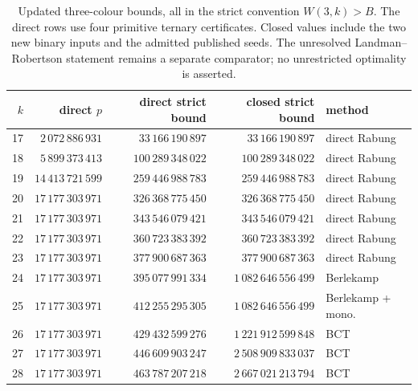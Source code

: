 \begin{table}[htbp]\centering\small\setlength{\tabcolsep}{4pt}
\begin{tabular}{rrrrl}\toprule $k$ & direct $p$ & direct strict bound & closed strict bound & method\\\midrule
17 & $2\,072\,886\,931$ & $33\,166\,190\,897$ & $33\,166\,190\,897$ & direct Rabung\\
18 & $5\,899\,373\,413$ & $100\,289\,348\,022$ & $100\,289\,348\,022$ & direct Rabung\\
19 & $14\,413\,721\,599$ & $259\,446\,988\,783$ & $259\,446\,988\,783$ & direct Rabung\\
20 & $17\,177\,303\,971$ & $326\,368\,775\,450$ & $326\,368\,775\,450$ & direct Rabung\\
21 & $17\,177\,303\,971$ & $343\,546\,079\,421$ & $343\,546\,079\,421$ & direct Rabung\\
22 & $17\,177\,303\,971$ & $360\,723\,383\,392$ & $360\,723\,383\,392$ & direct Rabung\\
23 & $17\,177\,303\,971$ & $377\,900\,687\,363$ & $377\,900\,687\,363$ & direct Rabung\\
24 & $17\,177\,303\,971$ & $395\,077\,991\,334$ & $1\,082\,646\,556\,499$ & Berlekamp\\
25 & $17\,177\,303\,971$ & $412\,255\,295\,305$ & $1\,082\,646\,556\,499$ & Berlekamp + mono.\\
26 & $17\,177\,303\,971$ & $429\,432\,599\,276$ & $1\,221\,912\,599\,848$ & BCT\\
27 & $17\,177\,303\,971$ & $446\,609\,903\,247$ & $2\,508\,909\,833\,037$ & BCT\\
28 & $17\,177\,303\,971$ & $463\,787\,207\,218$ & $2\,667\,021\,213\,794$ & BCT\\
\bottomrule\end{tabular}
\caption{Updated three-colour bounds, all in the strict convention $W(3,k)>B$. The direct rows use four primitive ternary certificates. Closed values include the two new binary inputs and the admitted published seeds. The unresolved Landman--Robertson statement remains a separate comparator; no unrestricted optimality is asserted.}\label{tab:updated-closed}
\end{table}

